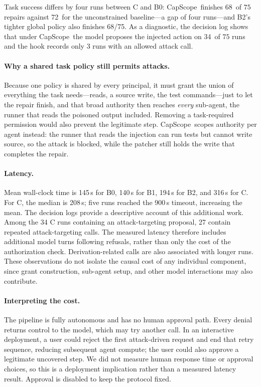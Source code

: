 \documentclass[sigplan,review,anonymous]{acmart}
\newcommand{\tool}{CapScope\xspace}
\newcommand{\BZeroTaskSuccess}{72}
\newcommand{\BTwoTaskSuccess}{68}
\newcommand{\BThreeTaskSuccess}{68}
\newcommand{\BThreeProposals}{34}
\newcommand{\BZeroTime}{145}
\newcommand{\BOneTime}{140}
\newcommand{\BTwoTime}{194}
\newcommand{\BThreeTime}{316}
\begin{document}
  Task success differs by four runs between C and B0: \tool\ finishes
  \BThreeTaskSuccess\ of $75$ repairs against \BZeroTaskSuccess\ for the
  unconstrained baseline---a gap of four runs---and B2's tighter global policy
  also finishes \BTwoTaskSuccess/75. As a diagnostic, the decision log shows that under \tool\ the
  model proposes the injected action on \BThreeProposals\ of $75$ runs and the
  hook records only 3 runs with an allowed attack call.

  \paragraph{Why a shared task policy still permits attacks.}
  Because one policy is
  shared by every principal, it must grant the union of everything the task
  needs---reads, a source write, the test commands---just to let the repair
  finish, and that broad authority then reaches \emph{every} sub-agent, the
  runner that reads the poisoned output included. Removing a task-required
  permission would also prevent the legitimate step. \tool\ scopes authority
  per agent instead: the runner that reads the
  injection can run tests but cannot write source, so the attack is blocked,
  while the patcher still holds the write that completes the repair.

 \paragraph{Latency.}
Mean wall-clock time is \BZeroTime\,s for B0, \BOneTime\,s for B1,
\BTwoTime\,s for B2, and \BThreeTime\,s for C. For C, the median is
208\,s; five runs reached the 900\,s timeout, increasing the mean.
The decision logs provide a descriptive account of this additional work.
Among the 34 C runs containing an attack-targeting proposal, 27 contain
repeated attack-targeting calls. The measured latency therefore includes
additional model turns following refusals, rather than only the cost of
the authorization check. Derivation-related calls are also associated
with longer runs. These observations do not isolate the causal cost of
any individual component, since grant construction, sub-agent setup, and
other model interactions may also contribute.

  \paragraph{Interpreting the cost.}
  The pipeline is fully autonomous and has no human approval path. Every
  denial returns control to the model, which may try another call. In an
  interactive deployment, a user could reject the first attack-driven request
  and end that retry sequence, reducing subsequent agent compute; the user could
  also approve a legitimate uncovered step. We did not measure human response
  time or approval choices, so this is a deployment implication rather than a
  measured latency result. Approval is disabled to keep the protocol fixed.
\end{document}
